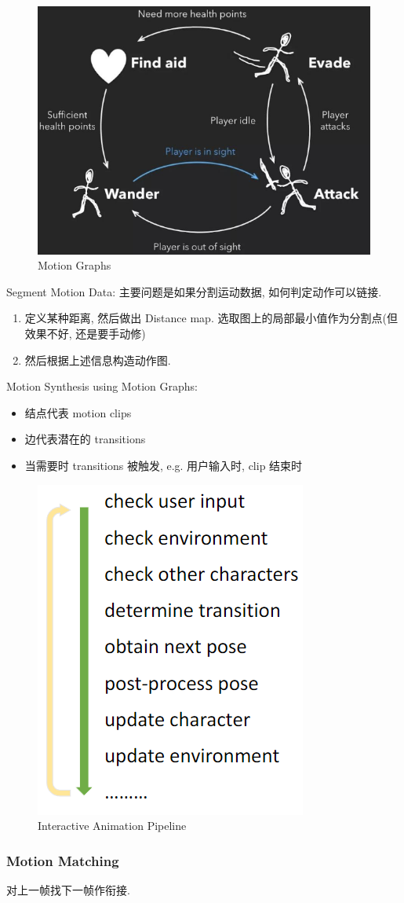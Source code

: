 \begin{figure}[!htb]
    \centering
    \includegraphics[width=0.618\linewidth]{pic/1055/Motion Graphs}
    \caption{Motion Graphs}
\end{figure}


Segment Motion Data: 主要问题是如果分割运动数据, 如何判定动作可以链接. 
\begin{enumerate}
    \item 定义某种距离, 然后做出 Distance map. 选取图上的局部最小值作为分割点(但效果不好, 还是要手动修)
    \item 然后根据上述信息构造动作图. 
\end{enumerate}

Motion Synthesis using Motion Graphs: 
\begin{itemize}
    \item 结点代表 motion clips
    \item 边代表潜在的 transitions
    \item 当需要时 transitions 被触发, e.g. 用户输入时, clip 结束时
\end{itemize}

\begin{figure}[!htb]
    \centering
    \includegraphics[width=0.42\linewidth]{pic/1055/Interactive Animation Pipeline}
    \caption{Interactive Animation Pipeline}
\end{figure}


\subsubsection{Motion Matching}
对上一帧找下一帧作衔接. 

